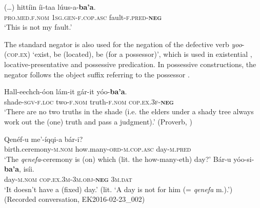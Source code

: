 \documentclass[output=paper,colorlinks,citecolor=brown,draftmode
]{langscibook}
\begin{document}
\ea\label{ex:treis:15} 
\gll (…) 	hittíin				íi-taa					lúus-a-\textbf{ba’a}.\\
{}	\textsc{pro.med.f.nom}	\textsc{1sg.gen-f.cop.asc}	fault-\textsc{f.pred-\textbf{neg}}\\
\glt ‘This is not my fault.’ \citep[12]{Saint-Exupéry2018}
\z 

The standard negator is also used for the negation of the defective verb \textit{yoo}- (\textsc{cop.ex}) ‘exist, be (located), be (for a possessor)’, which is used in existential , locative-presentative  and possessive  predication. In possessive constructions, the negator follows the object suffix referring to the possessor .


\ea\label{ex:treis:17} 
\gll Hall-eechch-óon lám-it gár-it yóo-\textbf{ba'a}.\\
shade-\textsc{sgv}-\textsc{f.loc} two-\textsc{f.nom} truth-\textsc{f.nom} \textsc{cop.ex.3f-\textbf{neg}}\\ 
\glt ‘There are no two truths in the shade (i.e. the elders under a shady tree always work out the (one) truth and pass a judgment).' (Proverb, \citealt[71]{AlamuAlamaayyo2017})
\z 

\ea\label{ex:treis:18}
    \begin{xlist}[B: ]
        \gll Qenéf-u 							me’-íqqi-a 							bár-i? \\ 
             birth.ceremony-\textsc{m.nom}	how.many-\textsc{ord-m.cop.asc}		day-\textsc{m.pred} \\ 
        \glt ‘The \textit{qenefa}-ceremony is (on) which (lit. the how-many-eth) day?’ 
        \gll Bár-u				yóo-si-\textbf{ba’a}, 				isíi. \\ 
             day-\textsc{m.nom} \textsc{cop.ex.3m-3m.obj-\textbf{neg}}	\textsc{3m.dat}  \\
        \glt ‘It doesn’t have a (fixed) day.’ (lit. ‘A day is not for him (= \textit{qenefa} m.).’)  (Recorded conversation, EK2016-02-23\_002)
    \end{xlist}
\z 
\end{document}
